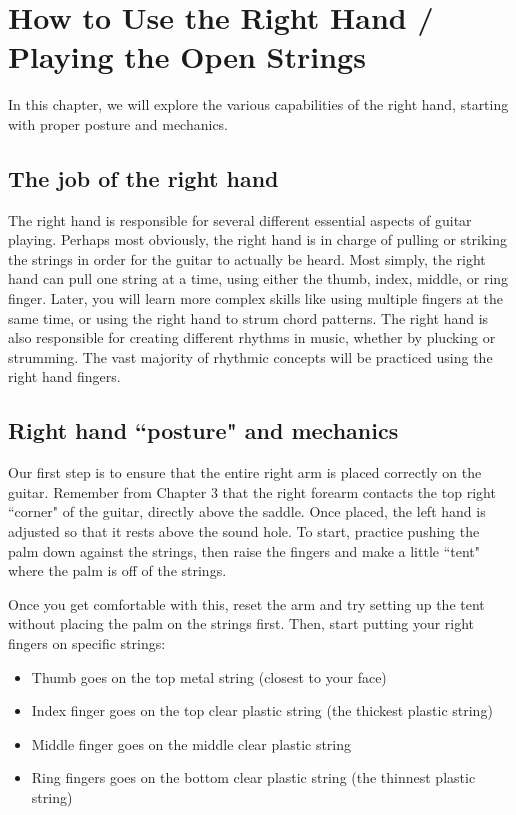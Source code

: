 \chapter[The Right Hand]{How to Use the Right Hand / Playing the Open Strings}

In this chapter, we will explore the various capabilities of the right hand, starting with proper posture and mechanics.

\section{The job of the right hand}

The right hand is responsible for several different essential aspects of guitar playing. Perhaps most obviously, the right hand is in charge of pulling or striking the strings in order for the guitar to actually be heard. Most simply, the right hand can pull one string at a time, using either the thumb, index, middle, or ring finger. Later, you will learn more complex skills like using multiple fingers at the same time, or using the right hand to strum chord patterns. The right hand is also responsible for creating different rhythms in music, whether by plucking or strumming. The vast majority of rhythmic concepts will be practiced using the right hand fingers.

\section{Right hand ``posture" and mechanics}

Our first step is to ensure that the entire right arm is placed correctly on the guitar. Remember from Chapter 3 that the right forearm contacts the top right ``corner" of the guitar, directly above the saddle. Once placed, the left hand is adjusted so that it rests above the sound hole. To start, practice pushing the palm down against the strings, then raise the fingers and make a little ``tent" where the palm is off of the strings.

Once you get comfortable with this, reset the arm and try setting up the tent without placing the palm on the strings first. Then, start putting your right fingers on specific strings:

\begin{itemize}
	
	\item Thumb goes on the top metal string (closest to your face)
	
	\item Index finger goes on the top clear plastic string (the thickest plastic string)
	
	\item Middle finger goes on the middle clear plastic string
	
	\item Ring fingers goes on the bottom clear plastic string (the thinnest plastic string)
	
\end{itemize}

